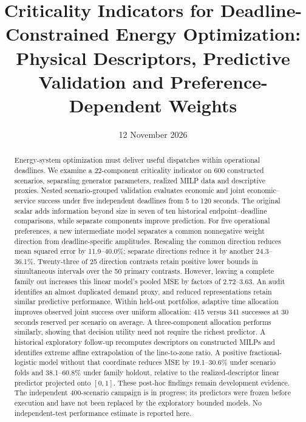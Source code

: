 
\date{12 November 2026}
\title{Criticality Indicators for Deadline-Constrained Energy Optimization:\\
Physical Descriptors, Predictive Validation and Preference-Dependent Weights}

\maketitle
\begin{abstract}
Energy-system optimization must deliver useful dispatches within operational
deadlines. We examine a 22-component criticality indicator on 600 constructed
scenarios, separating generator parameters, realized MILP data and descriptive
proxies. Nested scenario-grouped validation evaluates economic and joint
economic--service success under five independent deadlines from 5 to 120 seconds.
The original scalar adds information beyond size in seven of ten historical
endpoint--deadline comparisons, while separate components improve prediction.
For five operational preferences, a new intermediate model separates a common
nonnegative weight direction from deadline-specific amplitudes. Rescaling the
common direction reduces mean squared error by 11.9--40.0\%; separate directions
reduce it by another 24.3--36.1\%. Twenty-three of 25 direction contrasts retain
positive lower bounds in simultaneous intervals over the 50 primary contrasts.
However, leaving a complete family out increases this linear model's pooled
MSE by factors of 2.72--3.63. An audit identifies an almost duplicated demand
proxy, and reduced representations retain similar predictive performance.
Within held-out portfolios, adaptive time allocation improves observed joint
success over uniform allocation: 415 versus 341 successes at 30 seconds reserved
per scenario on average. A three-component allocation performs similarly,
showing that decision utility need not require the richest predictor.
A historical exploratory follow-up recomputes descriptors on constructed
MILPs and identifies extreme affine extrapolation of the line-to-zone ratio.
A positive fractional-logistic model without that coordinate reduces MSE
by 19.1--30.6\% under scenario folds and 38.1--60.8\% under family holdout,
relative to the realized-descriptor linear predictor projected onto $[0,1]$.
These post-hoc findings remain development evidence. The independent
400-scenario campaign is in progress; its predictors were frozen before
execution and have not been replaced by the exploratory bounded models.
No independent-test performance estimate is reported here.
\end{abstract}

